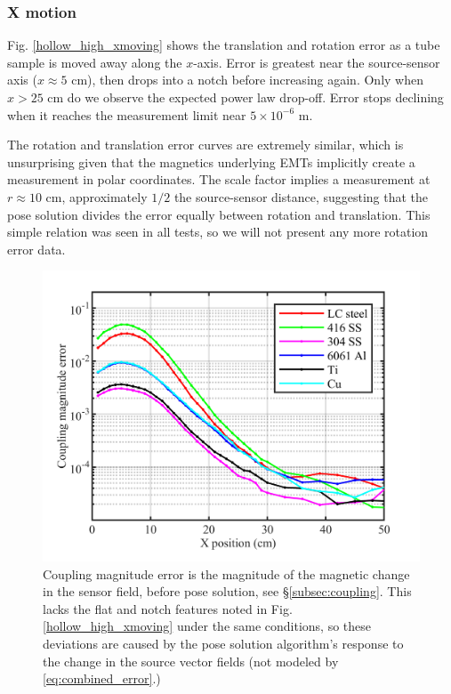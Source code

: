 \documentclass[journal,twoside,web]{ieeecolor}
\begin{document}
\subsubsection{X motion}
Fig. \ref{hollow_high_xmoving} shows the translation and rotation error as a tube sample is moved away along the $x$-axis. Error is greatest near the source-sensor axis ($x \approx 5$ cm), then drops into a notch before increasing again. Only when $x > 25$ cm do we observe the expected power law drop-off. Error stops declining when it reaches the measurement limit near $5 \times 10^{-6}$ m.

The rotation and translation error curves are extremely similar, which is unsurprising given that the magnetics underlying EMTs implicitly create a measurement in polar coordinates. The scale factor implies a measurement at $r\approx 10$ cm, approximately $1/2$ the source-sensor distance, suggesting that the pose solution divides the error equally between rotation and translation. This simple relation was seen in all tests, so we will not present any more rotation error data.

\begin{figure}[!htpb]
\centerline{\includegraphics[width=\columnwidth]{chaic7.png}}
\caption{Coupling magnitude error is the magnitude of the magnetic change in the sensor field, before pose solution, see \S\ref{subsec:coupling}. This lacks the flat and notch features noted in Fig. \ref{hollow_high_xmoving} under the same conditions, so these deviations are caused by the pose solution algorithm's response to the change in the source vector fields (not modeled by \eqref{eq:combined_error}.)}
\label{xmoving_coupling}
\end{figure}
\end{document}
